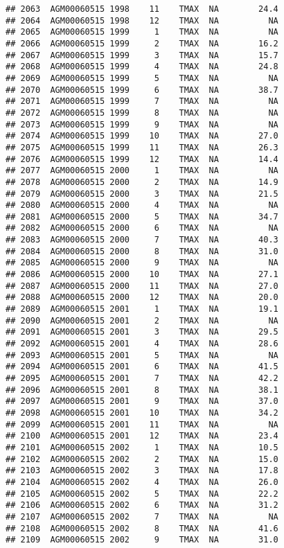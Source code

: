 \documentclass{article}\usepackage[]{graphicx}\usepackage[]{color}
\makeatletter
\newenvironment{kframe}{%
 \def\at@end@of@kframe{}%
 \ifinner\ifhmode%
  \def\at@end@of@kframe{\end{minipage}}%
  \begin{minipage}{\columnwidth}%
 \fi\fi%
 \def\FrameCommand##1{\hskip\@totalleftmargin \hskip-\fboxsep
 \colorbox{shadecolor}{##1}\hskip-\fboxsep
     \hskip-\linewidth \hskip-\@totalleftmargin \hskip\columnwidth}%
 \MakeFramed {\advance\hsize-\width
   \@totalleftmargin\z@ \linewidth\hsize
   \@setminipage}}%
 {\par\unskip\endMakeFramed%
 \at@end@of@kframe}
\newenvironment{knitrout}{}{} %
\makeatother
\begin{document}
\begin{knitrout}
\begin{kframe}
\begin{verbatim}
## 2063  AGM00060515 1998    11    TMAX  NA        24.4
## 2064  AGM00060515 1998    12    TMAX  NA          NA
## 2065  AGM00060515 1999     1    TMAX  NA          NA
## 2066  AGM00060515 1999     2    TMAX  NA        16.2
## 2067  AGM00060515 1999     3    TMAX  NA        15.7
## 2068  AGM00060515 1999     4    TMAX  NA        24.8
## 2069  AGM00060515 1999     5    TMAX  NA          NA
## 2070  AGM00060515 1999     6    TMAX  NA        38.7
## 2071  AGM00060515 1999     7    TMAX  NA          NA
## 2072  AGM00060515 1999     8    TMAX  NA          NA
## 2073  AGM00060515 1999     9    TMAX  NA          NA
## 2074  AGM00060515 1999    10    TMAX  NA        27.0
## 2075  AGM00060515 1999    11    TMAX  NA        26.3
## 2076  AGM00060515 1999    12    TMAX  NA        14.4
## 2077  AGM00060515 2000     1    TMAX  NA          NA
## 2078  AGM00060515 2000     2    TMAX  NA        14.9
## 2079  AGM00060515 2000     3    TMAX  NA        21.5
## 2080  AGM00060515 2000     4    TMAX  NA          NA
## 2081  AGM00060515 2000     5    TMAX  NA        34.7
## 2082  AGM00060515 2000     6    TMAX  NA          NA
## 2083  AGM00060515 2000     7    TMAX  NA        40.3
## 2084  AGM00060515 2000     8    TMAX  NA        31.0
## 2085  AGM00060515 2000     9    TMAX  NA          NA
## 2086  AGM00060515 2000    10    TMAX  NA        27.1
## 2087  AGM00060515 2000    11    TMAX  NA        27.0
## 2088  AGM00060515 2000    12    TMAX  NA        20.0
## 2089  AGM00060515 2001     1    TMAX  NA        19.1
## 2090  AGM00060515 2001     2    TMAX  NA          NA
## 2091  AGM00060515 2001     3    TMAX  NA        29.5
## 2092  AGM00060515 2001     4    TMAX  NA        28.6
## 2093  AGM00060515 2001     5    TMAX  NA          NA
## 2094  AGM00060515 2001     6    TMAX  NA        41.5
## 2095  AGM00060515 2001     7    TMAX  NA        42.2
## 2096  AGM00060515 2001     8    TMAX  NA        38.1
## 2097  AGM00060515 2001     9    TMAX  NA        37.0
## 2098  AGM00060515 2001    10    TMAX  NA        34.2
## 2099  AGM00060515 2001    11    TMAX  NA          NA
## 2100  AGM00060515 2001    12    TMAX  NA        23.4
## 2101  AGM00060515 2002     1    TMAX  NA        10.5
## 2102  AGM00060515 2002     2    TMAX  NA        15.0
## 2103  AGM00060515 2002     3    TMAX  NA        17.8
## 2104  AGM00060515 2002     4    TMAX  NA        26.0
## 2105  AGM00060515 2002     5    TMAX  NA        22.2
## 2106  AGM00060515 2002     6    TMAX  NA        31.2
## 2107  AGM00060515 2002     7    TMAX  NA          NA
## 2108  AGM00060515 2002     8    TMAX  NA        41.6
## 2109  AGM00060515 2002     9    TMAX  NA        31.0

\end{verbatim}
\end{kframe}
\end{knitrout}
\end{document}
